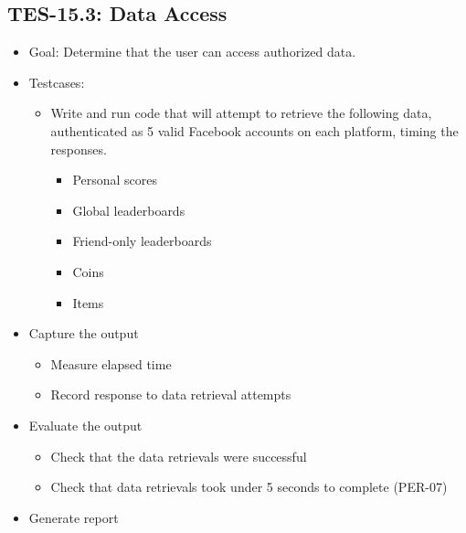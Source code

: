 \subsection{TES-15.3: Data Access}
\begin{itemize}
\item Goal: Determine that the user can access authorized data.
\item Testcases: 
\begin{itemize}
\item Write and run code that will attempt to retrieve the following data, 
authenticated as 5 valid Facebook accounts on each platform, 
timing the responses.
\begin{itemize}
\item Personal scores
\item Global leaderboards
\item Friend-only leaderboards
\item Coins
\item Items
\end{itemize}
\end{itemize}
\item Capture the output 
\begin{itemize}
\item Measure elapsed time 
\item Record response to data retrieval attempts
\end{itemize}
\item Evaluate the output 
\begin{itemize}
\item Check that the data retrievals were successful
\item Check that data retrievals took under 5 seconds to complete (PER-07) 
\end{itemize}
\item Generate report 
\end{itemize}

